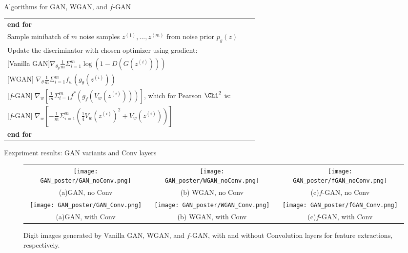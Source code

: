 \documentclass[final]{beamer}
\newlength{\colwidth}
\begin{document}
\begin{frame}[t]
\begin{columns}[t]
\begin{column}{\colwidth}
\begin{block}{Algorithms for GAN, WGAN, and $f$-GAN}
\begin{table}[t]
\begin{tabular}{lcr}
   
   \hspace{4mm} {\bf end for} \\
   \hspace{4mm} Sample minibatch of $m$ noise samples ${z^{(1)}, ..., z^{(m)}}$ from noise prior $p_g(z)$\\
   \hspace{4mm} Update the discriminator with chosen optimizer using gradient: \\
   \hspace{16mm}  {\color{green} [Vanilla GAN]$\nabla_{\theta_g} \frac{1}{m} \Sigma_{i=1}^m \log (1 - D(G(z^{(i)})))$} \\   
   \hspace{16mm} {\color{blue} [WGAN] $\nabla_{\theta} \frac{1}{m} \Sigma_{i=1}^m f_w(g_\theta(z^{(i)}))$ }\\   
   \hspace{16mm} [$f$-GAN] {\color{red} $\nabla_{w} [\frac{1}{m} \Sigma_{i=1}^m f^*(g_f(V_w(z^{(i)})))]$, which for Pearson $\Chi^2$ is:}\\
   \hspace{16mm} [$f$-GAN] {\color{red} $\nabla_{w} [ - \frac{1}{m} \Sigma_{i=1}^m \left( \frac{1}{4} V_w(z^{(i)})^2 + V_w(z^{(i)})\right)]$}\\
   
   {\bf end for} \\ \hline
  \end{tabular}
  \label{algo_gan}
\end{table}

    \end{block}



\begin{block}{Eexpriment results: GAN variants and Conv layers}

\begin{figure}
\centering
\begin{tabular}{ccc}
\texttt{[image: GAN\_poster/GAN\_noConv.png]} & 
\texttt{[image: GAN\_poster/WGAN\_noConv.png]} & 
\texttt{[image: GAN\_poster/fGAN\_noConv.png]} \\
(a)GAN, no Conv  & (b) WGAN, no Conv  & (c)$f$-GAN, no Conv  \\
\texttt{[image: GAN\_poster/GAN\_Conv.png]} & 
\texttt{[image: GAN\_poster/WGAN\_Conv.png]} & 
\texttt{[image: GAN\_poster/fGAN\_Conv.png]} \\
(a)GAN, with Conv  & (b) WGAN, with Conv  & (c)$f$-GAN, with Conv  \\[6pt]
\end{tabular}
\caption{Digit images generated by Vanilla GAN, WGAN, and $f$-GAN, with and without Convolution layers for feature extractions, respectively.}
\label{gans_conv}
\end{figure}




\end{block}
\end{column}
\end{columns}
\end{frame}
\end{document}
